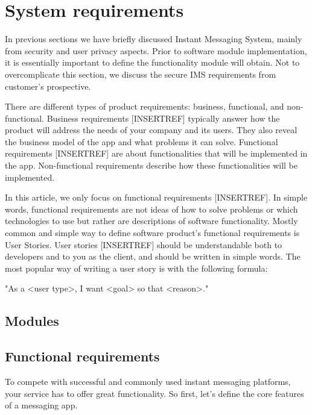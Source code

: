 \chapter{System requirements}\label{ch:system-requirements}

In previous sections we have briefly discussed Instant Messaging System, mainly from security and user privacy aspects.
Prior to software module implementation, it is essentially important to define the functionality module will obtain.
Not to overcomplicate this section, we discuss the secure IMS requirements from customer's prospective.

There are different types of product requirements: business, functional, and non-functional.
Business requirements [INSERTREF] typically answer how the product will address the needs of your company and its users.
They also reveal the business model of the app and what problems it can solve.
Functional requirements [INSERTREF] are about functionalities that will be implemented in the app.
Non-functional requirements describe how these functionalities will be implemented.

In this article, we only focus on functional requirements [INSERTREF].
In simple words, functional requirements are not ideas of how to solve problems or which technologies to use but rather
are descriptions of software functionality.
Mostly common and simple way to define software product's functional requirements is User Stories.
User stories [INSERTREF] should be understandable both to developers and to you as the client, and should be written in simple words.
The most popular way of writing a user story is with the following formula:

\begin{center}
    "As a <user type>, I want <goal> so that <reason>."
\end{center}


\section{Modules}\label{sec:modules}


\section{Functional requirements}\label{sec:functional-requirements}
To compete with successful and commonly used instant messaging platforms, your service has to offer great functionality.
So first, let’s define the core features of a messaging app.

